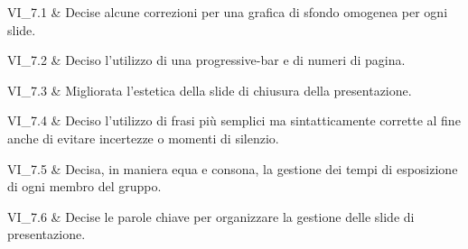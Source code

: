 VI\_7.1 & Decise alcune correzioni per una grafica di sfondo omogenea per ogni slide.

\tabularnewline 
VI\_7.2 & Deciso l'utilizzo di una progressive-bar e di numeri di pagina.

\tabularnewline 
VI\_7.3 & Migliorata l'estetica della slide di chiusura della presentazione.

\tabularnewline 
VI\_7.4 & Deciso l'utilizzo di frasi più semplici ma sintatticamente corrette al fine anche di evitare incertezze o momenti di silenzio.

\tabularnewline 
VI\_7.5 & Decisa, in maniera equa e consona, la gestione dei tempi di esposizione di ogni membro del gruppo.
		
\tabularnewline 
VI\_7.6 & Decise le parole chiave per organizzare la gestione delle slide di presentazione.
